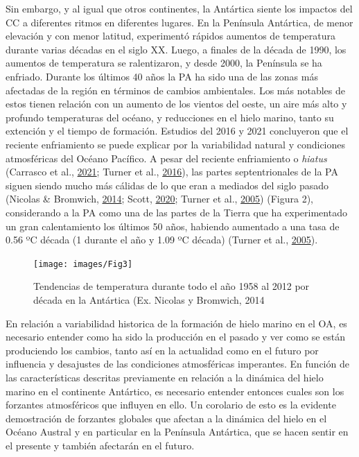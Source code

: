 \documentclass[
]{article}
\begin{document}
Sin embargo, y al igual que otros continentes, la Antártica siente los
impactos del CC a diferentes ritmos en diferentes lugares. En la
Península Antártica, de menor elevación y con menor latitud, experimentó
rápidos aumentos de temperatura durante varias décadas en el siglo XX.
Luego, a finales de la década de 1990, los aumentos de temperatura se
ralentizaron, y desde 2000, la Península se ha enfriado. Durante los
últimos 40 años la PA ha sido una de las zonas más afectadas de la
región en términos de cambios ambientales. Los más notables de estos
tienen relación con un aumento de los vientos del oeste, un aire más
alto y profundo temperaturas del océano, y reducciones en el hielo
marino, tanto su extención y el tiempo de formación. Estudios del 2016 y
2021 concluyeron que el reciente enfriamiento se puede explicar por la
variabilidad natural y condiciones atmosféricas del Océano Pacífico. A
pesar del reciente enfriamiento o \emph{hiatus} (Carrasco et al.,
\protect\hyperlink{ref-Carrasco2021b}{2021}; Turner et al.,
\protect\hyperlink{ref-Turner2016}{2016}), las partes septentrionales de
la PA siguen siendo mucho más cálidas de lo que eran a mediados del
siglo pasado (Nicolas \& Bromwich,
\protect\hyperlink{ref-Nicolas2014}{2014}; Scott,
\protect\hyperlink{ref-Scott2020}{2020}; Turner et al.,
\protect\hyperlink{ref-Turner2005}{2005}) (Figura 2), considerando a la
PA como una de las partes de la Tierra que ha experimentado un gran
calentamiento los últimos 50 años, habiendo aumentado a una tasa de 0.56
ºC década (1 durante el año y 1.09 ºC década) (Turner et al.,
\protect\hyperlink{ref-Turner2005}{2005}).

\pagebreak

\begin{figure}

{\centering \texttt{[image: images/Fig3]} 

}

\caption{Tendencias de temperatura durante todo el año 1958 al 2012 por década en la Antártica (Ex. Nicolas y Bromwich, 2014}\label{fig:unnamed-chunk-2}
\end{figure}

En relación a variabilidad historica de la formación de hielo marino en
el OA, es necesario entender como ha sido la producción en el pasado y
ver como se están produciendo los cambios, tanto así en la actualidad
como en el futuro por influencia y desajustes de las condiciones
atmosféricas imperantes. En función de las características descritas
previamente en relación a la dinámica del hielo marino en el continente
Antártico, es necesario entender entonces cuales son los forzantes
atmosféricos que influyen en ello. Un corolario de esto es la evidente
demostración de forzantes globales que afectan a la dinámica del hielo
en el Océano Austral y en particular en la Península Antártica, que se
hacen sentir en el presente y también afectarán en el futuro.
\end{document}
